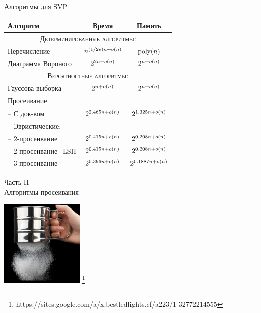 \documentclass[usenames,dvipsnames, 9pt]{beamer}
\newcommand\blfootnote[1]{%
	\begingroup
	\renewcommand\footnoterule{}
	\renewcommand\thefootnote{}\footnote{#1}%
	\addtocounter{footnote}{-1}%
	\endgroup
}
\begin{document}
\begin{frame}{Алгоритмы для SVP}
\renewcommand{\arraystretch}{1.5}
\begin{table}[h]
	\centering
	\begin{tabular}{| l | c | c |}
		\hline
		\textbf{Алгоритм} & \textbf{Время} & \textbf{Память} \\ \hline
		\multicolumn{3}{|c|}{\textsc{ Детерминированные алгоритмы:} } \\ \hline
		Перечисление & $n^{ (1/2e) n + o(n)}$ & $\mathrm{poly}(n)$ \\ \hline
		Диаграмма Вороного & $2^{2n + o(n)}$ & $2^{n+o(n)}$ \\ \hline
		\multicolumn{3}{|c|}{\textsc{ Вероятностные алгоритмы:} } \\ \hline
		Гауссова выборка  & $2^{n+ o(n)}$ & $2^{n+ o(n)}$ \\ \hline
		Просеивание & & \\ [-1ex]
		\hspace{5pt} -- С док-вом  & $2^{2.465n + o(n)}$& $2^{1.325n + o(n)}$ \\ [-1ex]
		\hspace{5pt} -- Эвристические: & & \\ [-1ex]
		\hspace{15pt} -- $2$-просеивание  & $2^{0.415 n + o(n)}$ & $2^{0.208n + o(n)}$\\
		\hspace{15pt} -- $2$-просеивание+LSH  & $2^{0.415 n + o(n)}$ & $2^{0.208n + o(n)}$\\
		\hspace{15pt} -- $3$-просеивание & $2^{0.396n + o(n)}$ & $2^{0.1887n + o(n)}$  \\ \hline
		
	\end{tabular}
\end{table}

\end{frame}

\begin{frame}
\renewcommand\footnoterule{}
\begin{center}
	
	Часть II \\ [10pt]
	
	\color{Orange}
	\Huge{Алгоритмы просеивания}
	
	\vspace{10pt}
	
	\includegraphics[width=4.0cm]{siever.jpg}
	\blfootnote{{\color{gray}https://sites.google.com/a/x.bestledlights.cf/a223/1-32772214555}}
\end{center}
\end{frame}
\end{document}
